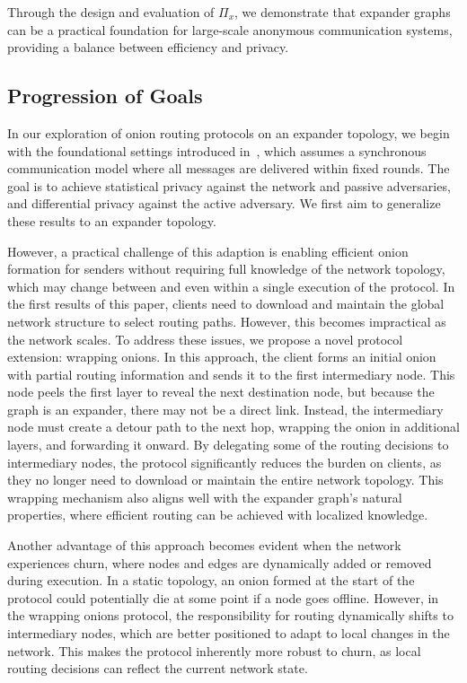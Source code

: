 Through the design and evaluation of $\Pi_x$, we demonstrate that expander graphs can be a practical foundation for large-scale anonymous communication systems, providing a balance between efficiency and privacy.

\subsection{Progression of Goals}

In our exploration of onion routing protocols on an expander topology, we begin with the foundational settings introduced in~\cite{ICALP:AndLysUpf18}, which assumes a synchronous communication model where all messages are delivered within fixed rounds. The goal is to achieve statistical privacy against the network and passive adversaries, and differential privacy against the active adversary. We first aim to generalize these results to an expander topology. 

However, a practical challenge of this adaption is enabling efficient onion formation for senders without requiring full knowledge of the network topology, which may change between and even within a single execution of the protocol. In the first results of this paper, clients need to download and maintain the global network structure to select routing paths. However, this becomes impractical as the network scales. To address these issues, we propose a novel protocol extension: wrapping onions. In this approach, the client forms an initial onion with partial routing information and sends it to the first intermediary node. This node peels the first layer to reveal the next destination node, but because the graph is an expander, there may not be a direct link. Instead, the intermediary node must create a detour path to the next hop, wrapping the onion in additional layers, and forwarding it onward. By delegating some of the routing decisions to intermediary nodes, the protocol significantly reduces the burden on clients, as they no longer need to download or maintain the entire network topology. This wrapping mechanism also aligns well with the expander graph's natural properties, where efficient routing can be achieved with localized knowledge.

Another advantage of this approach becomes evident when the network experiences churn, where nodes and edges are dynamically added or removed during execution. In a static topology, an onion formed at the start of the protocol could potentially die at some point if a node goes offline. However, in the wrapping onions protocol, the responsibility for routing dynamically shifts to intermediary nodes, which are better positioned to adapt to local changes in the network. This makes the protocol inherently more robust to churn, as local routing decisions can reflect the current network state.

